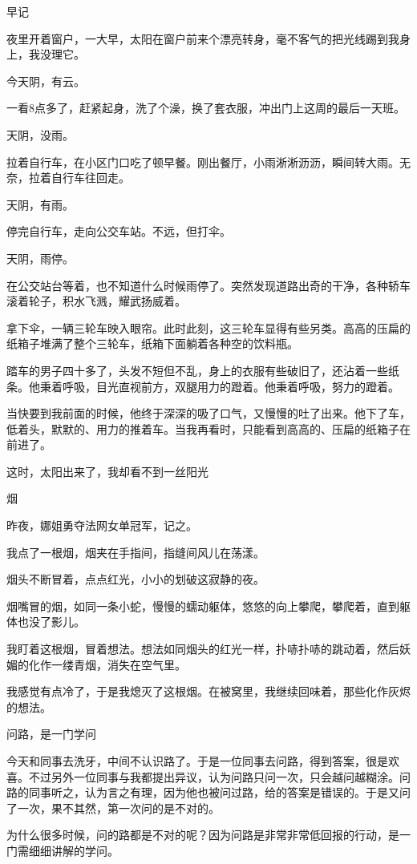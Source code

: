 早记

夜里开着窗户，一大早，太阳在窗户前来个漂亮转身，毫不客气的把光线踢到我身上，我没理它。

今天阴，有云。

一看8点多了，赶紧起身，洗了个澡，换了套衣服，冲出门上这周的最后一天班。

天阴，没雨。

拉着自行车，在小区门口吃了顿早餐。刚出餐厅，小雨淅淅沥沥，瞬间转大雨。无奈，拉着自行车往回走。

天阴，有雨。

停完自行车，走向公交车站。不远，但打伞。

天阴，雨停。

在公交站台等着，也不知道什么时候雨停了。突然发现道路出奇的干净，各种轿车滚着轮子，积水飞溅，耀武扬威着。

拿下伞，一辆三轮车映入眼帘。此时此刻，这三轮车显得有些另类。高高的压扁的纸箱子堆满了整个三轮车，纸箱下面躺着各种空的饮料瓶。

踏车的男子四十多了，头发不短但不乱，身上的衣服有些破旧了，还沾着一些纸条。他秉着呼吸，目光直视前方，双腿用力的蹬着。他秉着呼吸，努力的蹬着。

当快要到我前面的时候，他终于深深的吸了口气，又慢慢的吐了出来。他下了车，低着头，默默的、用力的推着车。当我再看时，只能看到高高的、压扁的纸箱子在前进了。

这时，太阳出来了，我却看不到一丝阳光


烟

昨夜，娜姐勇夺法网女单冠军，记之。

我点了一根烟，烟夹在手指间，指缝间风儿在荡漾。

烟头不断冒着，点点红光，小小的划破这寂静的夜。

烟嘴冒的烟，如同一条小蛇，慢慢的蠕动躯体，悠悠的向上攀爬，攀爬着，直到躯体也没了影儿。

我盯着这根烟，冒着想法。想法如同烟头的红光一样，扑哧扑哧的跳动着，然后妖媚的化作一缕青烟，消失在空气里。

我感觉有点冷了，于是我熄灭了这根烟。在被窝里，我继续回味着，那些化作灰烬的想法。

问路，是一门学问

今天和同事去洗牙，中间不认识路了。于是一位同事去问路，得到答案，很是欢喜。不过另外一位同事与我都提出异议，认为问路只问一次，只会越问越糊涂。问路的同事听之，认为言之有理，因为他也被问过路，给的答案是错误的。于是又问了一次，果不其然，第一次问的是不对的。

为什么很多时候，问的路都是不对的呢？因为问路是非常非常低回报的行动，是一门需细细讲解的学问。

